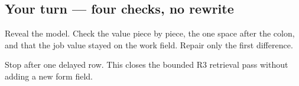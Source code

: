 \subsection*{Your turn — four checks, no rewrite}
Reveal the model. Check the value piece by piece, the one space after the colon, and that the job value stayed on the work field. Repair only the first difference.

\begin{tcolorbox}[breakable,colback=teal!4,colframe=teal!35!black,title={Before you move on}]
Stop after one delayed row. This closes the bounded R3 retrieval pass without adding a new form field.
\end{tcolorbox}
